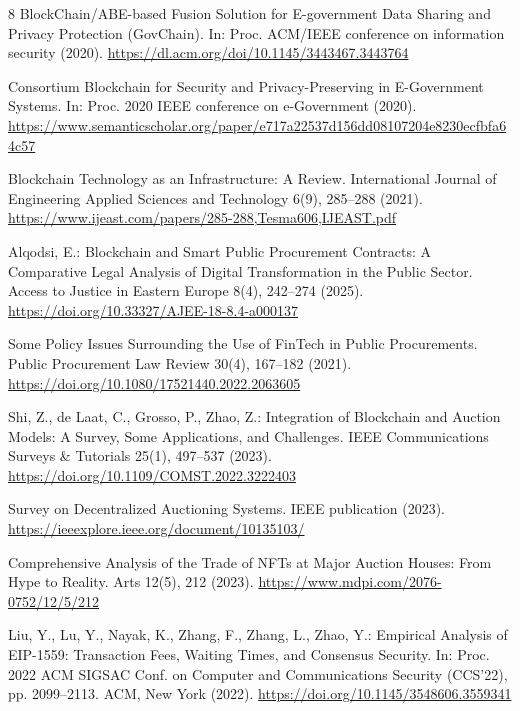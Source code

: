 \documentclass[runningheads]{llncs}
\begin{document}
\begin{thebibliography}{8}
BlockChain/ABE-based Fusion Solution for E-government Data Sharing and Privacy Protection (GovChain).
In: Proc. ACM/IEEE conference on information security (2020).
\url{https://dl.acm.org/doi/10.1145/3443467.3443764}

Consortium Blockchain for Security and Privacy-Preserving in E-Government Systems.
In: Proc. 2020 IEEE conference on e-Government (2020).
\url{https://www.semanticscholar.org/paper/e717a22537d156dd08107204e8230ecfbfa64c57}

Blockchain Technology as an Infrastructure: A Review.
International Journal of Engineering Applied Sciences and Technology 6(9), 285--288 (2021).
\url{https://www.ijeast.com/papers/285-288,Tesma606,IJEAST.pdf}

Alqodsi, E.:
Blockchain and Smart Public Procurement Contracts: A Comparative Legal Analysis of Digital Transformation in the Public Sector.
Access to Justice in Eastern Europe 8(4), 242--274 (2025).
\url{https://doi.org/10.33327/AJEE-18-8.4-a000137}

Some Policy Issues Surrounding the Use of FinTech in Public Procurements.
Public Procurement Law Review 30(4), 167--182 (2021).
\url{https://doi.org/10.1080/17521440.2022.2063605}


Shi, Z., de Laat, C., Grosso, P., Zhao, Z.:
Integration of Blockchain and Auction Models: A Survey, Some Applications, and Challenges.
IEEE Communications Surveys \& Tutorials 25(1), 497--537 (2023).
\url{https://doi.org/10.1109/COMST.2022.3222403}

Survey on Decentralized Auctioning Systems.
IEEE publication (2023).
\url{https://ieeexplore.ieee.org/document/10135103/}

Comprehensive Analysis of the Trade of NFTs at Major Auction Houses: From Hype to Reality.
Arts 12(5), 212 (2023).
\url{https://www.mdpi.com/2076-0752/12/5/212}


Liu, Y., Lu, Y., Nayak, K., Zhang, F., Zhang, L., Zhao, Y.:
Empirical Analysis of EIP-1559: Transaction Fees, Waiting Times, and Consensus Security.
In: Proc. 2022 ACM SIGSAC Conf. on Computer and Communications Security (CCS'22), pp. 2099--2113.
ACM, New York (2022).
\url{https://doi.org/10.1145/3548606.3559341}


\end{thebibliography}
\end{document}
